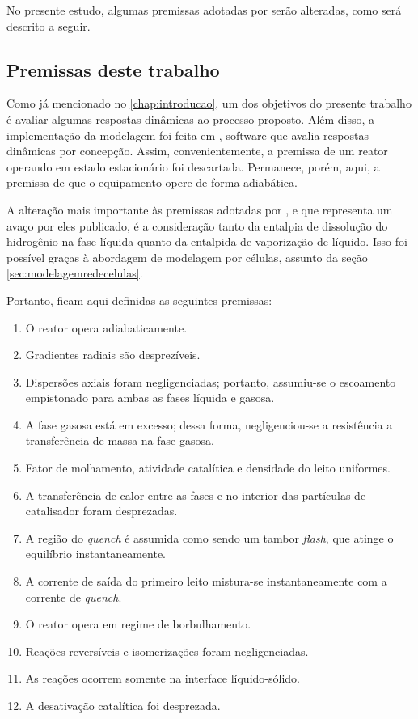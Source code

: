 No presente estudo, algumas premissas adotadas por  serão
alteradas, como será descrito a seguir. 

\subsection{Premissas deste trabalho} \label{sec:premissasdestetrabalho}

Como já mencionado no \autoref{chap:introducao}, um dos objetivos do presente
trabalho é avaliar algumas respostas dinâmicas ao processo proposto. Além disso,
a implementação da modelagem foi feita em \emso, software que avalia respostas
dinâmicas por concepção. Assim, convenientemente, a premissa de um reator
operando em estado estacionário foi descartada. Permanece, porém, aqui, a
premissa de que o equipamento opere de forma adiabática.

A alteração mais importante às premissas adotadas por , e
que representa um avaço por eles publicado, é a consideração tanto da entalpia
de dissolução do hidrogênio na fase líquida quanto da entalpida de vaporização
de líquido. Isso foi possível graças à abordagem de modelagem por células,
assunto da seção \autoref{sec:modelagemredecelulas}.

Portanto, ficam aqui definidas as seguintes premissas:

\begin{enumerate}
  \item O reator opera adiabaticamente.
  \item Gradientes radiais são desprezíveis.
  \item Dispersões axiais foram negligenciadas; portanto, assumiu-se o
  escoamento empistonado para ambas as fases líquida e gasosa.
  \item A fase gasosa está em excesso; dessa forma, negligenciou-se a
  resistência a transferência de massa na fase gasosa.
  \item Fator de molhamento, atividade catalítica e densidade do leito
  uniformes.
  \item A transferência de calor entre as fases e no interior das partículas de
  catalisador foram desprezadas.
  \item A região do \emph{quench} é assumida como sendo um tambor \emph{flash}, que
  atinge o equilíbrio instantaneamente.
  \item A corrente de saída do primeiro leito mistura-se instantaneamente com a
  corrente de \emph{quench}.
  \item O reator opera em regime de borbulhamento.
  \item Reações reversíveis e isomerizações foram negligenciadas.
  \item As reações ocorrem somente na interface líquido-sólido.
  \item A desativação catalítica foi desprezada.
\end{enumerate}

